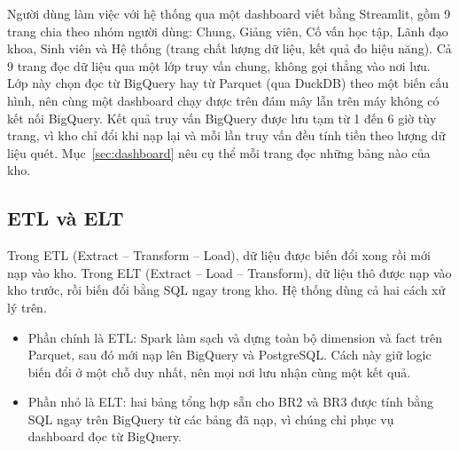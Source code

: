 Người dùng làm việc với hệ thống qua một dashboard viết bằng Streamlit, gồm 9 trang chia
theo nhóm người dùng: Chung, Giảng viên, Cố vấn học tập, Lãnh đạo khoa, Sinh viên và Hệ thống
(trang chất lượng dữ liệu, kết quả đo hiệu năng). Cả 9 trang đọc dữ liệu qua một lớp truy
vấn chung, không gọi thẳng vào nơi lưu. Lớp này chọn đọc từ BigQuery hay từ Parquet (qua
DuckDB) theo một biến cấu hình, nên cùng một dashboard chạy được trên đám mây lẫn trên máy
không có kết nối BigQuery. Kết quả truy vấn BigQuery được lưu tạm từ 1 đến 6 giờ tùy trang,
vì kho chỉ đổi khi nạp lại và mỗi lần truy vấn đều tính tiền theo lượng dữ liệu quét.
Mục~\ref{sec:dashboard} nêu cụ thể mỗi trang đọc những bảng nào của kho.

\subsection{ETL và ELT}
\label{sec:etl-elt}

Trong ETL (Extract -- Transform -- Load), dữ liệu được biến đổi xong rồi mới nạp vào kho.
Trong ELT (Extract -- Load -- Transform), dữ liệu thô được nạp vào kho trước, rồi biến đổi
bằng SQL ngay trong kho. Hệ thống dùng cả hai cách xử lý trên. 
\begin{itemize}
    \item Phần chính là ETL: Spark làm sạch và dựng toàn bộ dimension và fact trên Parquet, sau đó mới nạp lên BigQuery và PostgreSQL. Cách này giữ logic biến đổi ở một chỗ duy nhất, nên mọi nơi lưu nhận cùng một kết quả.
    \item Phần nhỏ là ELT: hai bảng tổng hợp sẵn cho BR2 và BR3 được tính bằng SQL ngay trên BigQuery từ các bảng đã nạp, vì chúng chỉ phục vụ dashboard đọc từ BigQuery.
\end{itemize}
 